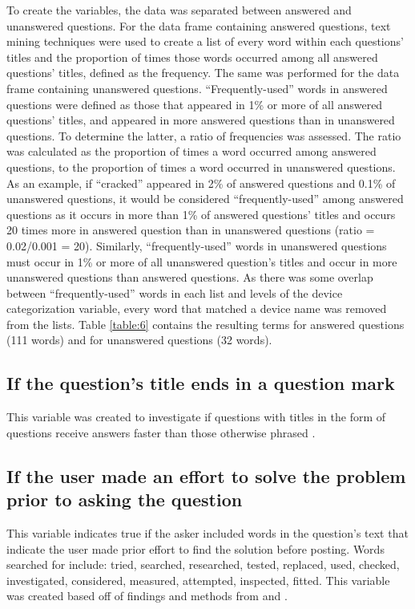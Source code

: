 \documentclass[]{interact}\usepackage[]{graphicx}\usepackage[]{color}
\begin{document}
To create the variables, the data was separated between answered and unanswered questions. For the data frame containing answered questions, text mining techniques were used to create a list of every word within each questions' titles and the proportion of times those words occurred among all answered questions' titles, defined as the frequency. The same was performed for the data frame containing unanswered questions. ``Frequently-used'' words in answered questions were defined as those that appeared in 1\% or more of all answered questions' titles, and appeared in more answered questions than in unanswered questions. To determine the latter, a ratio of frequencies was assessed. The ratio was calculated as the proportion of times a word occurred among answered questions, to the proportion of times a word occurred in unanswered questions. As an example, if ``cracked'' appeared in 2\% of answered questions and 0.1\% of unanswered questions, it would be considered ``frequently-used'' among answered questions as it occurs in more than 1\% of answered questions' titles and occurs 20 times more in answered question than in unanswered questions (ratio = 0.02/0.001 = 20). Similarly, ``frequently-used'' words in unanswered questions must occur in 1\% or more of all unanswered question's titles and occur in more unanswered questions than answered questions. As there was some overlap between ``frequently-used'' words in each list and levels of the device categorization variable, every word that matched a device name was removed from the lists. Table \ref{table:6} contains the resulting terms for answered questions (111 words) and for unanswered questions (32 words).

\subsection{If the question's title ends in a question mark}

This variable was created to investigate if questions with titles in the form of questions receive answers faster than those otherwise phrased \cite{Bhat2014}. 


\subsection{If the user made an effort to solve the problem prior to asking the question}

This variable indicates true if the asker included words in the question's text that indicate the user made prior effort to find the solution before posting. Words searched for include: tried, searched, researched, tested, replaced, used, checked, investigated, considered, measured, attempted, inspected, fitted. This variable was created based off of findings and methods from \cite{Bhat2014} and \cite{Harper2008}. 
\end{document}
